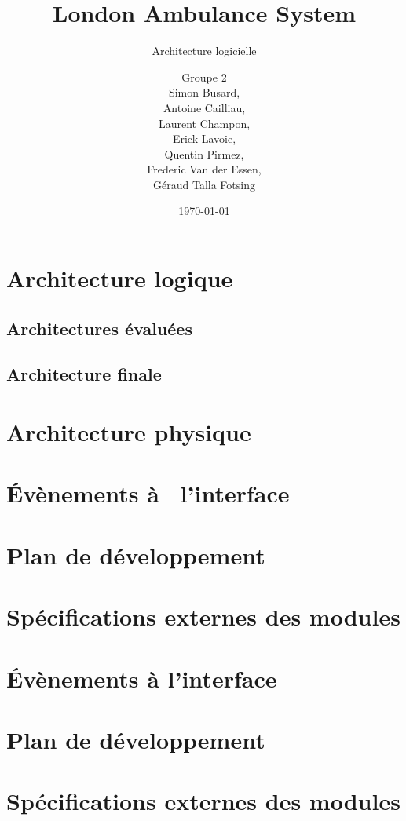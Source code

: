 \documentclass{report}
\title{London Ambulance System}
\subtitle{Architecture logicielle}
\author{\normalsize{Groupe 2}\\
\footnotesize{
Simon Busard, \\
Antoine Cailliau, \\
Laurent Champon,\\
Erick Lavoie, \\
Quentin Pirmez,\\
Frederic Van der Essen, \\
Géraud Talla Fotsing}}
\date{\today}
\begin{document}
\setlength{\parskip}{1em}
\startdocument

\maketitle
\setcounter{tocdepth}{1}
\tableofcontents

\chapter{Architecture logique}
	\section{Architectures évaluées }
		
	\section{Architecture finale}

\chapter{Architecture physique}

\chapter{Évènements à  l'interface}
	

\chapter{Plan de développement}
	

\chapter{Spécifications externes des modules}

\chapter{Évènements à l'interface}
	

\chapter{Plan de développement}
	

\chapter{Spécifications externes des modules}
\end{document}
